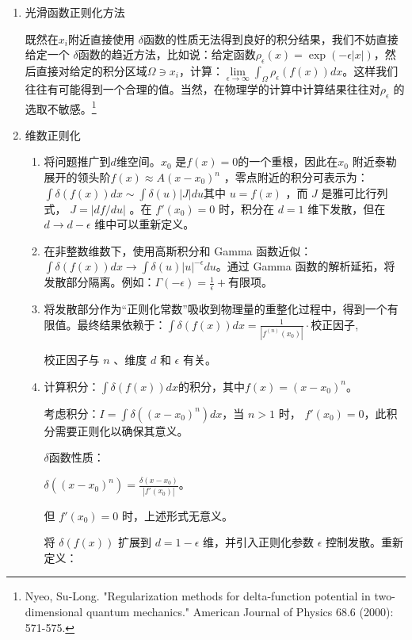 \documentclass[lang=cn,10pt,newtx,bibend=biber,device=pad]{elegantbook}
\begin{document}
\begin{enumerate}
    \item 光滑函数正则化方法

    既然在$x_i$附近直接使用 $\delta$函数的性质无法得到良好的积分结果，我们不妨直接给定一个 $\delta$函数的趋近方法，比如说：给定函数$\rho_\epsilon(x) = \exp(-\epsilon|x|)$，然后直接对给定的积分区域$\Omega \owns x_i$，计算：$\lim\limits_{\epsilon\rightarrow \infty} \int_{\Omega} \rho_\epsilon(f(x)) dx$。这样我们往往有可能得到一个合理的值。当然，在物理学的计算中计算结果往往对$\rho_\epsilon$ 的选取不敏感。\footnote{Nyeo, Su-Long. "Regularization methods for delta-function potential in two-dimensional quantum mechanics." American Journal of Physics 68.6 (2000): 571-575.}
    \item 维数正则化

    \begin{enumerate}
        \item 将问题推广到$d$维空间。$x_0$ 是$f(x) = 0$的一个重根，因此在$x_0$ 附近泰勒展开的领头阶$f(x) \approx  A(x-x_0)^n$ ，零点附近的积分可表示为：$\int \delta(f(x)) dx \sim \int \delta(u) |J| du$其中  $u = f(x)$ ，而  $J$  是雅可比行列式， $J = |df/du|$ 。在  $f'(x_0) = 0$  时，积分在  $d=1$  维下发散，但在  $d \to d-\epsilon$  维中可以重新定义。
        \item 在非整数维数下，使用高斯积分和 Gamma 函数近似：$\int \delta(f(x)) dx \to \int \delta(u) |u|^{-\epsilon} du$。通过 Gamma 函数的解析延拓，将发散部分隔离。例如：$\Gamma(-\epsilon) = \frac{1}{\epsilon} + \text{有限项}$。
        \item 将发散部分作为“正则化常数”吸收到物理量的重整化过程中，得到一个有限值。最终结果依赖于：$\int \delta(f(x)) dx = \frac{1}{|f^{(n)}(x_0)|} \cdot \text{校正因子}$,

        校正因子与  $n$ 、维度  $d$  和  $\epsilon$  有关。
        \item 
        \begin{example}
        计算积分：$\int \delta(f(x))dx$的积分，其中$f(x) = (x-x_0)^n$。

        考虑积分：$ I = \int \delta((x - x_0)^n) dx $，当  $n > 1$  时， $f{\prime}(x_0) = 0$，此积分需要正则化以确保其意义。

        $\delta$函数性质：

        $\delta((x - x_0)^n) = \frac{\delta(x - x_0)}{|f{\prime}(x_0)|}$。

        但  $f{\prime}(x_0) = 0$  时，上述形式无意义。

        将  $\delta(f(x))$  扩展到  $d = 1 - \epsilon$  维，并引入正则化参数  $\epsilon$  控制发散。重新定义：


\end{example}
\end{enumerate}
\end{enumerate}
\end{document}
